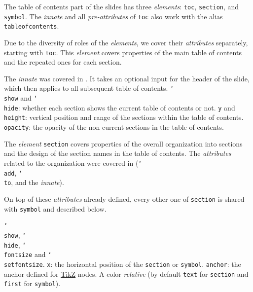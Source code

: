 \documentclass{slixte}
\newcommand{\codetext}[1]{\texttt{\color{second}#1}}
\newcommand{\cmdt}[1]{\char`\\#1}
\newcommand{\sptm}[1]{\textit{\color{third}#1}}
\newcommand{\tikzref}{\href{https://en.wikipedia.org/wiki/PGF/TikZ}{\color{first}TikZ}}
\begin{document}
\hypertarget{custom:toc}{}
\begin{slide}
    The table of contents part of the slides has three \sptm{elements}: \codetext{toc}, \codetext{section}, and \codetext{symbol}.
    The \sptm{innate} and all \sptm{pre-attributes} of \codetext{toc} also work with the alias \codetext{tableofcontents}.

    \spacing[1]

    Due to the diversity of roles of the \sptm{elements}, we cover their \sptm{attributes} separately, starting with \codetext{toc}.
    This \sptm{element} covers properties of the main table of contents and the repeated ones for each section.
    \begin{itemize}
        \fillitem The \sptm{innate} was covered in . It takes an optional input for the header of the slide, which then applies to all subsequent table of contents.
        \fillitem \codetext{\cmdt{show}} and \codetext{\cmdt{hide}}: whether each section shows the current table of contents or not.
        \fillitem \codetext{y} and \codetext{height}: vertical position and range of the sections within the table of contents.
        \fillitem \codetext{opacity}: the opacity of the non-current sections in the table of contents.
    \end{itemize}
\end{slide}

\begin{slide}
    The \sptm{element} \codetext{section} covers properties of the overall organization into sections and the design of the section names in the table of contents.
    The \sptm{attributes} related to the organization were covered in  (\codetext{\cmdt{add}}, \codetext{\cmdt{to}}, and the \sptm{innate}).

    \spacing[1]

    On top of these \sptm{attributes} already defined, every other one of \codetext{section} is shared with \codetext{symbol} and described below.
    \begin{itemize}
        \fillitem \codetext{\cmdt{show}}, \codetext{\cmdt{hide}}, \codetext{\cmdt{fontsize}} and \codetext{\cmdt{setfontsize}}.
        \fillitem \codetext{x}: the horizontal position of the \codetext{section} or \codetext{symbol}.
        \fillitem \codetext{anchor}: the anchor defined for \tikzref{} nodes.
        \fillitem A color \sptm{relative} (by default \codetext{text} for \codetext{section} and \codetext{first} for \codetext{symbol}).
    \end{itemize}
\end{slide}
\end{document}

